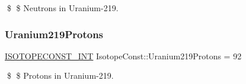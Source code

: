 \$ \$ Neutrons in Uranium-\/219. \mbox{\label{group___isotope_const-_uranium-_u219_ga9c989e5b477c06b09cfb70074af46a3f}} 
\subsubsection{\texorpdfstring{Uranium219\+Protons}{Uranium219Protons}}
{\footnotesize\ttfamily \mbox{\hyperlink{group___isotope_const-_macros_ga5f18360b3e99483a35c32d789e62621c}{I\+S\+O\+T\+O\+P\+E\+C\+O\+N\+S\+T\+\_\+\+I\+NT}} Isotope\+Const\+::\+Uranium219\+Protons = 92}

\$ \$ Protons in Uranium-\/219. 